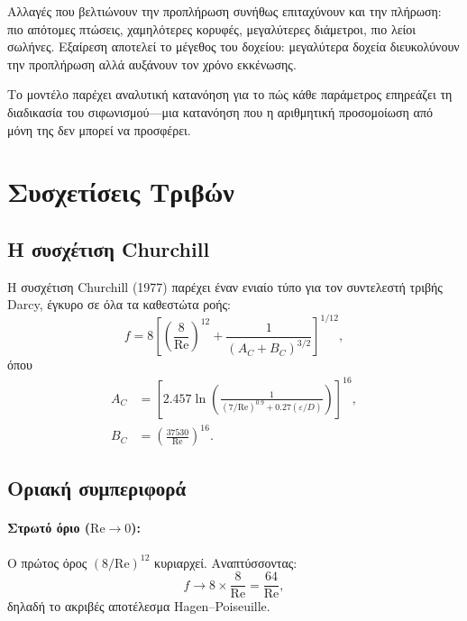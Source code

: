 \documentclass[11pt]{article}
\begin{document}
Αλλαγές που βελτιώνουν την προπλήρωση συνήθως επιταχύνουν και την πλήρωση: πιο απότομες πτώσεις, χαμηλότερες κορυφές, μεγαλύτερες διάμετροι, πιο λείοι σωλήνες. Εξαίρεση αποτελεί το μέγεθος του δοχείου: μεγαλύτερα δοχεία διευκολύνουν την προπλήρωση αλλά αυξάνουν τον χρόνο εκκένωσης.

Το μοντέλο παρέχει αναλυτική κατανόηση για το πώς κάθε παράμετρος επηρεάζει τη διαδικασία του σιφωνισμού---μια κατανόηση που η αριθμητική προσομοίωση από μόνη της δεν μπορεί να προσφέρει.

\appendix
\section{Συσχετίσεις Τριβών}
\label{app:friction}

\subsection{Η συσχέτιση Churchill}

Η συσχέτιση Churchill (1977) παρέχει έναν ενιαίο τύπο για τον συντελεστή τριβής Darcy, έγκυρο σε όλα τα καθεστώτα ροής:
\begin{equation}
  f = 8\left[\left(\frac{8}{\text{Re}}\right)^{12} + \frac{1}{(A_C + B_C)^{3/2}}\right]^{1/12},
  \label{eq:churchill-full}
\end{equation}
όπου
\begin{align}
  A_C &= \left[2.457\ln\left(\frac{1}{(7/\text{Re})^{0.9} + 0.27(\varepsilon/D)}\right)\right]^{16}, \\
  B_C &= \left(\frac{37530}{\text{Re}}\right)^{16}.
\end{align}

\subsection{Οριακή συμπεριφορά}

\paragraph{Στρωτό όριο ($\text{Re} \to 0$):}
Ο πρώτος όρος $(8/\text{Re})^{12}$ κυριαρχεί. Αναπτύσσοντας:
\[
  f \to 8 \times \frac{8}{\text{Re}} = \frac{64}{\text{Re}},
\]
δηλαδή το ακριβές αποτέλεσμα Hagen--Poiseuille.
\end{document}
